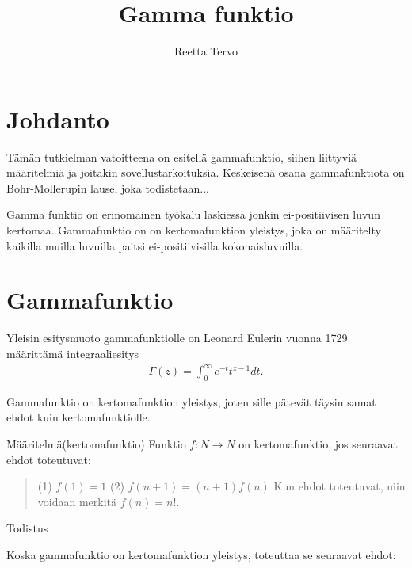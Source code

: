 \documentclass[12pt]{article}
\title{Gamma funktio}
\author{Reetta Tervo}
\begin{document}
\maketitle

\newpage
\tableofcontents

\newpage
\section{Johdanto}
\onehalfspacing
Tämän tutkielman vatoitteena on esitellä gammafunktio, siihen liittyviä määritelmiä ja joitakin sovellustarkoituksia. Keskeisenä osana gammafunktiota on Bohr-Mollerupin lause, joka todistetaan...

Gamma funktio on erinomainen työkalu laskiessa jonkin ei-positiivisen luvun kertomaa. 
\newline
Gammafunktio on on kertomafunktion yleistys, joka on määritelty kaikilla muilla luvuilla paitsi ei-positiivisilla kokonaisluvuilla. 
\newpage


\section{Gammafunktio}
Yleisin esitysmuoto gammafunktiolle on Leonard Eulerin vuonna 1729 määrittämä integraaliesitys
\begin{align*}
    \Gamma(z) = \int_{0}^{\infty} e^{-t} t^{z-1} dt.
\end{align*}

Gammafunktio on kertomafunktion yleistys, joten sille pätevät täysin samat ehdot kuin kertomafunktiolle. 

Määritelmä(kertomafunktio) \newline
Funktio $f: N \rightarrow N$ on kertomafunktio, jos seuraavat ehdot toteutuvat:

\begin{quote}
    (1) $f(1)=1$ \newline
    (2) $f(n+1)=(n+1)f(n)$ \newline
    Kun ehdot toteutuvat, niin voidaan merkitä $f(n)=n!$.
\end{quote}
Todistus \newline

Koska gammafunktio on kertomafunktion yleistys, toteuttaa se seuraavat ehdot:
\end{document}
